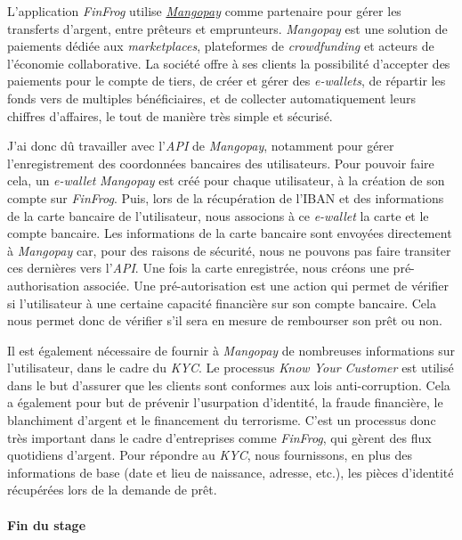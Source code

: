 L'application \emph{FinFrog} utilise
\href{https://www.mangopay.com/fr/}{\emph{Mangopay}} comme partenaire
pour gérer les transferts d'argent, entre prêteurs et emprunteurs.
\emph{Mangopay} est une solution de paiements dédiée aux
\emph{marketplaces}, plateformes de \emph{crowdfunding} et acteurs de
l'économie collaborative. La société offre à ses clients la possibilité
d'accepter des paiements pour le compte de tiers, de créer et gérer des
\emph{e-wallets}, de répartir les fonds vers de multiples bénéficiaires,
et de collecter automatiquement leurs chiffres d'affaires, le tout de
manière très simple et sécurisé.

\bigskip

J'ai donc dû travailler avec l'\emph{API} de \emph{Mangopay}, notamment
pour gérer l'enregistrement des coordonnées bancaires des utilisateurs.
Pour pouvoir faire cela, un \emph{e-wallet} \emph{Mangopay} est créé
pour chaque utilisateur, à la création de son compte sur \emph{FinFrog}.
Puis, lors de la récupération de l'IBAN et des informations de la carte
bancaire de l'utilisateur, nous associons à ce \emph{e-wallet} la carte
et le compte bancaire. Les informations de la carte bancaire sont
envoyées directement à \emph{Mangopay} car, pour des raisons de
sécurité, nous ne pouvons pas faire transiter ces dernières vers
l'\emph{API}. Une fois la carte enregistrée, nous créons une
pré-authorisation associée. Une pré-autorisation est une action qui
permet de vérifier si l'utilisateur à une certaine capacité financière
sur son compte bancaire. Cela nous permet donc de vérifier s'il sera en
mesure de rembourser son prêt ou non.

\bigskip

Il est également nécessaire de fournir à \emph{Mangopay} de nombreuses
informations sur l'utilisateur, dans le cadre du \emph{KYC}. Le
processus \emph{Know Your Customer} est utilisé dans le but d'assurer
que les clients sont conformes aux lois anti-corruption. Cela a
également pour but de prévenir l'usurpation d'identité, la fraude
financière, le blanchiment d'argent et le financement du terrorisme.
C'est un processus donc très important dans le cadre d'entreprises comme
\emph{FinFrog}, qui gèrent des flux quotidiens d'argent. Pour répondre
au \emph{KYC}, nous fournissons, en plus des informations de base (date
et lieu de naissance, adresse, etc.), les pièces d'identité récupérées
lors de la demande de prêt.

\bigskip

\paragraph{Fin du stage}\label{fin-du-stage}

